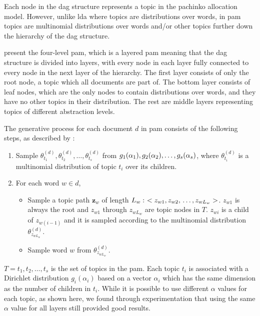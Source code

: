 Each node in the \gls{dag} structure represents a topic in the pachinko allocation model. 
However, unlike \gls{lda} where topics are distributions over words, in \gls{pam} topics are multinomial distributions over words and/or other topics further down the hierarchy of the \gls{dag} structure.

\citet{li2006pachinko} present the four-level \gls{pam}, which is a layered \gls{pam} meaning that the \gls{dag} structure is divided into layers, with every node in each layer fully connected to every node in the next layer of the hierarchy.
The first layer consists of only the root node, a topic which all documents are part of.
The bottom layer consists of leaf nodes, which are the only nodes to contain distributions over words, and they have no other topics in their distribution.
The rest are middle layers representing topics of different abstraction levels.

The generative process for each document $d$ in \gls{pam} consists of the following steps, as described by \citet{li2006pachinko}:
\begin{enumerate}
	\item Sample $\theta_{t_1}^{(d)}, \theta_{t_2}^{(d)}, \dots, \theta_{t_s}^{(d)}$ from $g_1(\alpha_1), g_2(\alpha_2), \dots, \newline g_s(\alpha_s)$, where $\theta_{t_i}^{(d)}$ is a multinomial distribution of topic $t_i$ over its children.
	\item For each word $w \in d$,
	\begin{itemize}
		\item Sample a topic path $\mathbf{z}_w$ of length $L_w:~< z_{w1}, z_{w2},\newline \dots, z_{wL_w} >$. $z_{w1}$ is always the root and $z_{w1}$ through $z_{wL_w}$ are topic nodes in $T$. $z_{wi}$ is a child of $z_{w(i-1)}$ and it is sampled according to the multinomial distribution $\theta_{z_{wL_w}}^{(d)}$.
		\item Sample word $w$ from $\theta_{z_{wL_w}}^{(d)}$.
	\end{itemize}
\end{enumerate}

$T = {t_1, t_2, \dots, t_s}$ is the set of topics in the \gls{pam}. 
Each topic $t_i$ is associated with a Dirichlet distribution $g_i(\alpha_i)$ based on a vector $\alpha_i$ which has the same dimension as the number of children in $t_i$.
While it is possible to use different $\alpha$ values for each topic, as shown here, we found through experimentation that using the same $\alpha$ value for all layers still provided good results.

